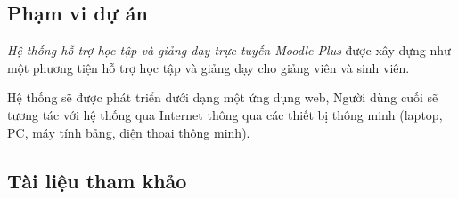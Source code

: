 \documentclass[./../main.tex]{subfiles}
\begin{document}
\subsection{Phạm vi dự án}
\textit{Hệ thống hỗ trợ học tập và giảng dạy trực tuyến Moodle Plus} được xây dựng như một phương tiện hỗ trợ học tập và giảng dạy cho giảng viên và sinh viên.

Hệ thống sẽ được phát triển dưới dạng một ứng dụng web, Người dùng cuối sẽ tương tác với hệ thống qua Internet thông qua các thiết bị thông minh (laptop, PC, máy tính bảng, điện thoại thông minh).

\subsection{Tài liệu tham khảo}
\nocite{*}
\printbibliography[heading=none]
\end{document}
